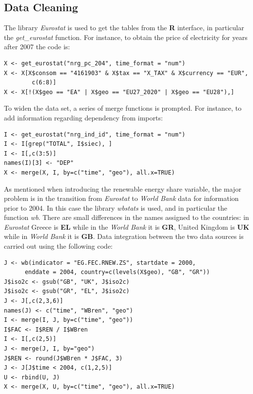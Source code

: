 \documentclass[a4paper,12pt]{book}
\begin{document}
\begin{appendices}
\chapter*{Data Cleaning}
The library \textit{Eurostat} is used to get the tables from the \textbf{R} interface, in particular the \textit{get\_eurostat} function. For instance, to obtain the price of electricity for years after 2007 the code is:

\begin{verbatim}
X <- get_eurostat("nrg_pc_204", time_format = "num")
X <- X[X$consom == "4161903" & X$tax == "X_TAX" & X$currency == "EUR",
		c(6:8)]
X <- X[!(X$geo == "EA" | X$geo == "EU27_2020" | X$geo == "EU28"),]
\end{verbatim}

To widen the data set, a series of merge functions is prompted. For instance, to add information regarding dependency from imports:

\begin{verbatim}
I <- get_eurostat("nrg_ind_id", time_format = "num")
I <- I[grep("TOTAL", I$siec), ]
I <- I[,c(3:5)]
names(I)[3] <- "DEP"
X <- merge(X, I, by=c("time", "geo"), all.x=TRUE)
\end{verbatim}

As mentioned when introducing the renewable energy share variable, the major problem is in the transition from \textit{Eurostat} to \textit{World Bank} data for information prior to 2004. In this case the library \textit{wbstats} is used, and in particular the function \textit{wb}. There are small differences in the names assigned to the countries: in \textit{Eurostat} Greece is \textbf{EL} while in the \textit{World Bank} it is \textbf{GR}, United Kingdom is \textbf{UK} while in \textit{World Bank} it is \textbf{GB}. Data integration between the two data sources is carried out using the following code:

\begin{verbatim}
J <- wb(indicator = "EG.FEC.RNEW.ZS", startdate = 2000, 
	  enddate = 2004, country=c(levels(X$geo), "GB", "GR"))
J$iso2c <- gsub("GB", "UK", J$iso2c)
J$iso2c <- gsub("GR", "EL", J$iso2c)
J <- J[,c(2,3,6)]
names(J) <- c("time", "WBren", "geo")
I <- merge(I, J, by=c("time", "geo"))
I$FAC <- I$REN / I$WBren
I <- I[,c(2,5)]
J <- merge(J, I, by="geo")
J$REN <- round(J$WBren * J$FAC, 3)
J <- J[J$time < 2004, c(1,2,5)]
U <- rbind(U, J)
X <- merge(X, U, by=c("time", "geo"), all.x=TRUE)
\end{verbatim}


\end{appendices}
\end{document}
